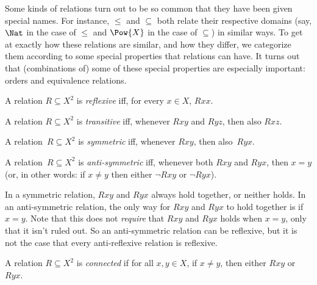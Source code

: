 \documentclass[../../include/open-logic-section]{subfiles}
\begin{document}

\begin{intro}
Some kinds of relations turn out to be so common that they have been
given special names.  For instance, $\le$ and $\subseteq$ both relate
their respective domains (say, $\Nat$ in the case of $\le$ and
$\Pow{X}$ in the case of $\subseteq$) in similar ways.  To get at
exactly how these relations are similar, and how they differ, we
categorize them according to some special properties that relations
can have.  It turns out that (combinations of) some of these special
properties are especially important: orders and equivalence relations.
\end{intro}

\begin{defn}
A relation $R \subseteq X^2$ is \emph{reflexive} iff, for every $x \in
X$, $Rxx$.
\end{defn}

\begin{defn}
A relation $R \subseteq X^2$ is \emph{transitive} iff, whenever $Rxy$
and $Ryz$, then also $Rxz$.
\end{defn}

\begin{defn}
A relation~$R \subseteq X^2$ is \emph{symmetric} iff, whenever 
$Rxy$, then also~$Ryx$.
\end{defn}

\begin{defn}
A relation~$R \subseteq X^2$ is \emph{anti-symmetric} iff, whenever both
$Rxy$ and $Ryx$, then $x=y$ (or, in other words: if $x\neq y$ then
either $\lnot Rxy$ or $\lnot Ryx$).
\end{defn}

\begin{explain}
In a symmetric relation, $Rxy$ and $Ryx$ always hold together, or
neither holds. In an anti-symmetric relation, the only way for $Rxy$
and $Ryx$ to hold together is if $x = y$.  Note that this does not
\emph{require} that $Rxy$ and $Ryx$ holds when $x = y$, only that it
isn't ruled out.  So an anti-symmetric relation can be reflexive, but
it is not the case that every anti-reflexive relation is reflexive.
\end{explain}

\begin{defn}
A relation $R \subseteq X^2$ is \emph{connected} if for all $x,y\in
X$, if $x \neq y$, then either $Rxy$ or~$Ryx$.
\end{defn}
\end{document}

